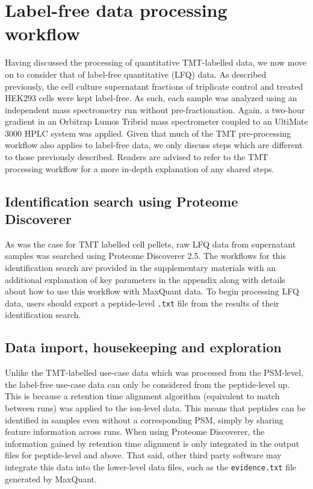 \documentclass[9pt,a4paper,]{extarticle}
\begin{document}
\section{Label-free data processing workflow}\label{label-free-data-processing-workflow}

Having discussed the processing of quantitative TMT-labelled data, we now move
on to consider that of label-free quantitative (LFQ) data. As described
previously, the cell culture supernatant fractions of triplicate control and
treated HEK293 cells were kept label-free. As such, each sample was analyzed using
an independent mass spectrometry run without pre-fractionation. Again, a two-hour
gradient in an Orbitrap Lumos Tribrid mass spectrometer coupled to an UltiMate
3000 HPLC system was applied. Given that much of the TMT pre-processing workflow
also applies to label-free data, we only discuss steps which are different to
those previously described. Readers are advised to refer to the TMT processing
workflow for a more in-depth explanation of any shared steps.

\subsection{Identification search using Proteome Discoverer}\label{identification-search-using-proteome-discoverer}

As was the case for TMT labelled cell pellets, raw LFQ data from supernatant
samples was searched using Proteome Discoverer 2.5. The workflows for this
identification search are provided in the supplementary materials with an additional
explanation of key parameters in the appendix along with details about how to
use this workflow with MaxQuant data. To begin processing LFQ data,
users should export a peptide-level \texttt{.txt} file from the results of their
identification search.

\subsection{Data import, housekeeping and exploration}\label{data-import-housekeeping-and-exploration-1}

Unlike the TMT-labelled use-case data which was processed from the PSM-level, the
label-free use-case data can only be considered from the peptide-level up. This
is because a retention time alignment algorithm (equivalent to match between runs)
was applied to the ion-level data. This means that peptides can be identified in
samples even without a corresponding PSM, simply by sharing feature information
across runs. When using Proteome Discoverer, the information gained by retention
time alignment is only integrated in the output files for peptide-level and above.
That said, other third party software may integrate this data into the lower-level
data files, such as the \texttt{evidence.txt} file generated by MaxQuant.
\end{document}
